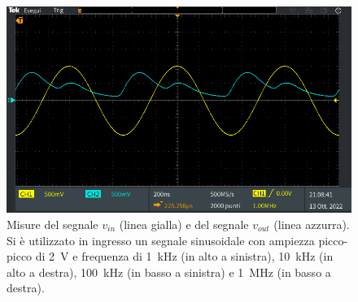 \begin{figure}[tbh]
\begin{minipage}{.496\textwidth}
	\end{minipage}
	\begin{minipage}{.496\textwidth}
		\includegraphics[width=\linewidth]{./ImageFiles/Laboratorio 2/TEK00048.PNG}
	\end{minipage}
	\caption{Misure del segnale $v_{in}$ (linea gialla) e del segnale $v_{out}$ (linea azzurra). Si è utilizzato in ingresso un segnale sinusoidale con ampiezza picco-picco di \SI{2}{\volt} e frequenza di \SI{1}{\kilo\hertz} (in alto a sinistra), \SI{10}{\kilo\hertz} (in alto a destra), \SI{100}{\kilo\hertz} (in basso a sinistra) e \SI{1}{\mega\hertz} (in basso a destra).}
	\label{fig:analisi_circuito_3_freq}
\end{figure}

